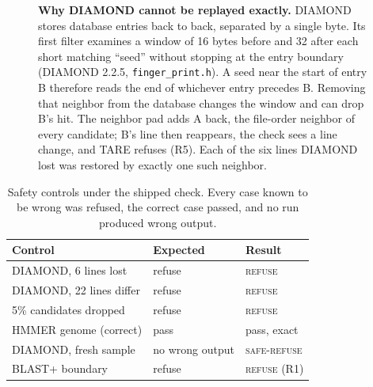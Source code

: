 \documentclass[letterpaper,twocolumn,10pt]{article}
\theoremstyle{definition}
\newcommand{\sys}{TARE\xspace}
\newcommand{\sys}{PARE\xspace}
\newcommand{\dec}[1]{\textsc{#1}}
\begin{document}
\begin{figure}[t]
\begin{tikzpicture}[font=\scriptsize, x=0.40cm, y=0.5cm]
\end{tikzpicture}
\caption{\textbf{Why DIAMOND cannot be replayed exactly.} DIAMOND stores database entries back to back, separated by a
single byte. Its first filter examines a window of 16 bytes before and 32 after each short matching ``seed'' without
stopping at the entry boundary (DIAMOND 2.2.5, \texttt{finger\_print.h}). A seed near the start of entry B therefore
reads the end of whichever entry precedes B. Removing that neighbor from the database changes the window and can drop
B's hit. The neighbor pad adds A back, the file\nobreakdash-order neighbor of every candidate; B's line then reappears, the check
sees a line change, and \sys refuses (R5). Each of the six lines DIAMOND lost was restored by exactly one such neighbor.}
\label{fig:diamond}
\end{figure}

\begin{table}[t]
\caption{Safety controls under the shipped check. Every case known to be wrong was refused, the correct case passed,
and no run produced wrong output.}
\label{tab:safety}
\centering\small
\setlength{\tabcolsep}{3pt}
\begin{tabular}{@{}lll@{}}
\toprule
Control & Expected & Result \\
\midrule
DIAMOND, 6 lines lost & refuse & \dec{refuse} \\
DIAMOND, 22 lines differ & refuse & \dec{refuse} \\
5\% candidates dropped & refuse & \dec{refuse} \\
HMMER genome (correct) & pass   & pass, exact \\
DIAMOND, fresh sample & no wrong output & \dec{safe-refuse} \\
BLAST+ boundary & refuse & \dec{refuse} (R1) \\
\bottomrule
\end{tabular}
\end{table}
\end{document}
